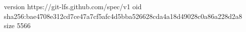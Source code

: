 version https://git-lfs.github.com/spec/v1
oid sha256:bae4708e312cd7ce47a7cf5afc4d5bba526628cda4a18d49028c0a86a228d2a8
size 5566
